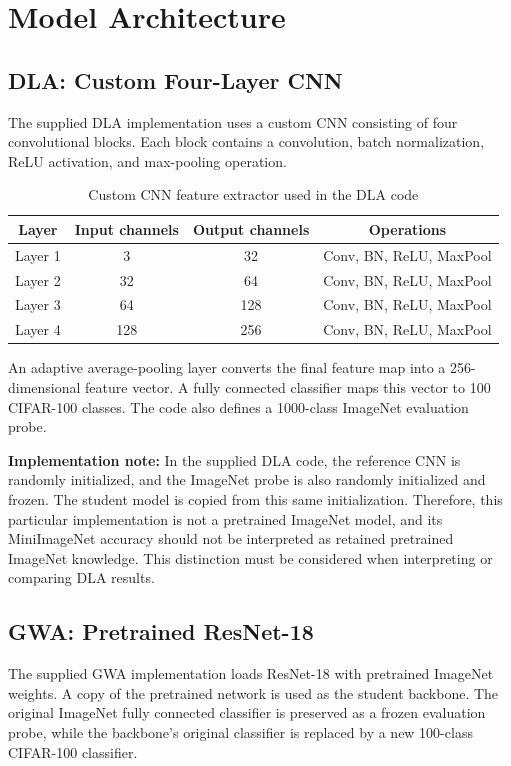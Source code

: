 \documentclass[12pt,a4paper]{report}
\begin{document}
\section{Model Architecture}

\subsection{DLA: Custom Four-Layer CNN}
The supplied DLA implementation uses a custom CNN consisting of four
convolutional blocks. Each block contains a convolution, batch
normalization, ReLU activation, and max-pooling operation.

\begin{table}[H]
\centering
\caption{Custom CNN feature extractor used in the DLA code}
\begin{tabular}{cccc}
\toprule
\textbf{Layer} & \textbf{Input channels} & \textbf{Output channels} & \textbf{Operations}\\
\midrule
Layer 1 & 3 & 32 & Conv, BN, ReLU, MaxPool\\
Layer 2 & 32 & 64 & Conv, BN, ReLU, MaxPool\\
Layer 3 & 64 & 128 & Conv, BN, ReLU, MaxPool\\
Layer 4 & 128 & 256 & Conv, BN, ReLU, MaxPool\\
\bottomrule
\end{tabular}
\end{table}

An adaptive average-pooling layer converts the final feature map into a
256-dimensional feature vector. A fully connected classifier maps this
vector to 100 CIFAR-100 classes. The code also defines a 1000-class
ImageNet evaluation probe.

\textbf{Implementation note:} In the supplied DLA code, the reference
CNN is randomly initialized, and the ImageNet probe is also randomly
initialized and frozen. The student model is copied from this same
initialization. Therefore, this particular implementation is not a
pretrained ImageNet model, and its MiniImageNet accuracy should not be
interpreted as retained pretrained ImageNet knowledge. This distinction
must be considered when interpreting or comparing DLA results.

\subsection{GWA: Pretrained ResNet-18}
The supplied GWA implementation loads ResNet-18 with pretrained
ImageNet weights. A copy of the pretrained network is used as the
student backbone. The original ImageNet fully connected classifier is
preserved as a frozen evaluation probe, while the backbone's original
classifier is replaced by a new 100-class CIFAR-100 classifier.
\end{document}
